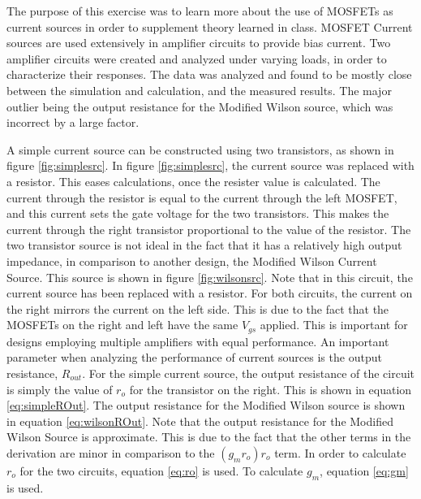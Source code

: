 
\def \labnum	{\#3}
\def \tonames   {Tyler Nicholson}
\def \disptitle	{MOSFET Current Sources}
\def \datestart	{03-20-2015}
\def \dateend	{04-03-2015}





The purpose of this exercise was to learn more about the use of MOSFETs as current sources in order to supplement theory learned in class. 
MOSFET Current sources are used extensively in amplifier circuits to provide bias current. 
Two amplifier circuits were created and analyzed under varying loads, in order to characterize their responses. 
The data was analyzed and found to be mostly close between the simulation and calculation, and the measured results. The major outlier being the output resistance for the Modified Wilson source, which was incorrect by a large factor. 

A simple current source can be constructed using two transistors, as shown in figure \ref{fig:simplesrc}.
In figure \ref{fig:simplesrc}, the current source was replaced with a resistor. This eases calculations, once the resister value is calculated. 
The current through the resistor is equal to the current through the left MOSFET, and this current sets the gate voltage for the two transistors. This makes the current through the right transistor proportional to the value of the resistor. 
The two transistor source is not ideal in the fact that it has a relatively high output impedance, in comparison to another design, the Modified Wilson Current Source. This source is shown in figure \ref{fig:wilsonsrc}. Note that in this circuit, the current source has been replaced with a resistor. For both circuits, the current on the right mirrors the current on the left side. This is due to the fact that the MOSFETs on the right and left have the same $V_{gs}$ applied. 
This is important for designs employing multiple amplifiers with equal performance. 
An important parameter when analyzing the performance of current sources is the output resistance, $R_{out}$. For the simple current source, the output resistance of the circuit is simply the value of $r_o$ for the transistor on the right. This is shown in equation \ref{eq:simpleROut}.
The output resistance for the Modified Wilson source is shown in equation \ref{eq:wilsonROut}. 
Note that the output resistance for the Modified Wilson Source is approximate. This is due to the fact that the other terms in the derivation are minor in comparison to the $(g_mr_o)r_o$ term. 
In order to calculate $r_o$ for the two circuits, equation \ref{eq:ro} is used. To calculate $g_m$, equation \ref{eq:gm} is used. 

